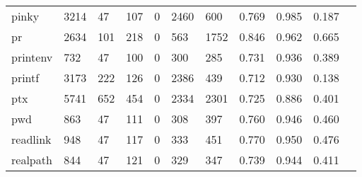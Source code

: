 \begin{longtable}{lp{1.10cm}p{1.10cm}p{1.10cm}p{1.10cm}p{1.10cm}p{1.10cm}p{1.10cm}p{1.10cm}p{1.10cm}p{1.10cm}}
pinky     &                   3214 &                                 47 &                               107 &                                0 &                              2460 &                             600 &                          0.769 &                                 0.985 &                               0.187 \\
pr        &                   2634 &                                101 &                               218 &                                0 &                               563 &                            1752 &                          0.846 &                                 0.962 &                               0.665 \\
printenv  &                    732 &                                 47 &                               100 &                                0 &                               300 &                             285 &                          0.731 &                                 0.936 &                               0.389 \\
printf    &                   3173 &                                222 &                               126 &                                0 &                              2386 &                             439 &                          0.712 &                                 0.930 &                               0.138 \\
ptx       &                   5741 &                                652 &                               454 &                                0 &                              2334 &                            2301 &                          0.725 &                                 0.886 &                               0.401 \\
pwd       &                    863 &                                 47 &                               111 &                                0 &                               308 &                             397 &                          0.760 &                                 0.946 &                               0.460 \\
readlink  &                    948 &                                 47 &                               117 &                                0 &                               333 &                             451 &                          0.770 &                                 0.950 &                               0.476 \\
realpath  &                    844 &                                 47 &                               121 &                                0 &                               329 &                             347 &                          0.739 &                                 0.944 &                               0.411 \\

\end{longtable}
